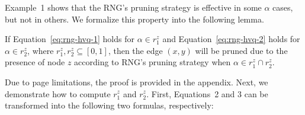  
Example~1 shows that the RNG's pruning strategy is effective in some $\alpha$ cases, but not in others. We formalize this property into the following lemma.
\vspace*{-0.5em}
\begin{lemma}
\label{lemma:drng}
If Equation~\ref{eq:rng-hvq-1} holds for $\alpha \in r^z_1$ and Equation~\ref{eq:rng-hvq-2} holds for $\alpha \in r^z_2$, where $r^z_1, r^z_2 \subseteq [0, 1]$, then the edge $(x, y)$ will be pruned due to the presence of node $z$ according to RNG's pruning strategy when $\alpha \in r^z_1 \cap r^z_2$. 
\end{lemma}
\vspace*{-0.5em}
Due to page limitations, the proof is provided in the appendix. Next, we demonstrate how to compute $r^z_1$ and $r^z_2$. First, 
Equations~2 and 3
can be transformed into the following two formulas, respectively:%


